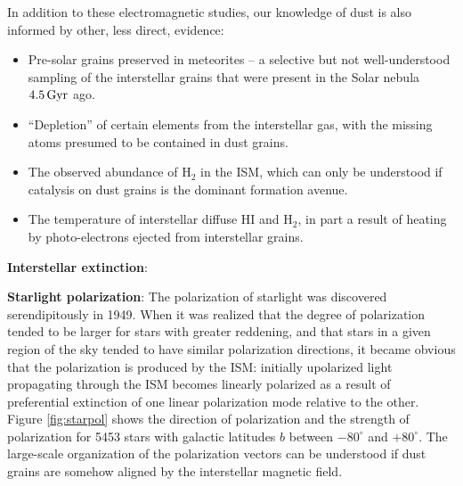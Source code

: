 \documentclass[a4paper,10pt]{article}
\begin{document}
{\noindent}In addition to these electromagnetic studies, our knowledge of dust is also informed by other, less direct, evidence:

\begin{itemize}
    \item Pre-solar grains preserved in meteorites -- a selective but not well-understood sampling of the interstellar grains that were present in the Solar nebula $4.5\,{\rm Gyr}$ ago.
    \item ``Depletion'' of certain elements from the interstellar gas, with the missing atoms presumed to be contained in dust grains.
    \item The observed abundance of H$_2$ in the ISM, which can only be understood if catalysis on dust grains is the dominant formation avenue.
    \item The temperature of interstellar diffuse HI and H$_2$, in part a result of heating by photo-electrons ejected from interstellar grains.
\end{itemize}

{\noindent}\textbf{Interstellar extinction}: 

{\noindent}\textbf{Starlight polarization}: The polarization of starlight was discovered serendipitously in 1949. When it was realized that the degree of polarization tended to be larger for stars with greater reddening, and that stars in a given region of the sky tended to have similar polarization directions, it became obvious that the polarization is produced by the ISM: initially upolarized light propagating through the ISM becomes linearly polarized as a result of preferential extinction of one linear polarization mode relative to the other. Figure \ref{fig:starpol} shows the direction of polarization and the strength of polarization for 5453 stars with galactic latitudes $b$ between $-80^\circ$ and $+80^\circ$. The large-scale organization of the polarization vectors can be understood if dust grains are somehow aligned by the interstellar magnetic field. 
\end{document}
